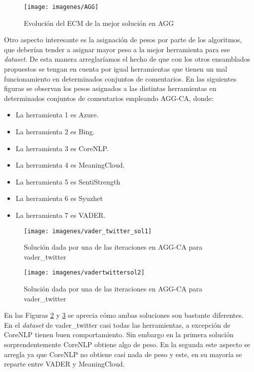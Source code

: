 \begin{figure} [H]
	\centering
	\texttt{[image: imagenes/AGG]}
	\caption{Evolución del ECM de la mejor solución en AGG}
	\label{fig:agg}
\end{figure}

Otro aspecto interesante es la asignación de pesos por parte de los algoritmos, que deberían tender a asignar mayor peso a la mejor herramienta para ese \textit{dataset}. De esta manera arreglaríamos el hecho de que con los otros ensamblados propuestos se tengan en cuenta por igual herramientas que tienen un mal funcionamiento en determinados conjuntos de comentarios. En las siguientes figuras se observan los pesos asignados a las distintas herramientas en determinados conjuntos de comentarios empleando AGG-CA, donde:
\begin{itemize}
	\item La herramienta 1 es Azure.
	\item La herramienta 2 es Bing.
	\item La herramienta 3 es CoreNLP.
	\item La herramienta 4 es MeaningCloud.
	\item La herramienta 5 es SentiStrength
	\item La herramienta 6 es Syuzhet
	\item La herramienta 7 es VADER.
\end{itemize}
\begin{figure} [H]
	\centering
	\texttt{[image: imagenes/vader\_twitter\_sol1]}
	\caption{Solución dada por una de las iteraciones en AGG-CA para vader\_twitter}
	\label{fig:vadertwittersol1}
\end{figure}

\begin{figure} [H]
	\centering
	\texttt{[image: imagenes/vadertwittersol2]}
	\caption{Solución dada por una de las iteraciones en AGG-CA para vader\_twitter}
	\label{fig:vadertwittersol2}
\end{figure}

En las Figuras \ref{fig:vadertwittersol1} y \ref{fig:vadertwittersol2} se aprecia cómo ambas soluciones son bastante diferentes. En el \textit{dataset} de vader\_twitter casi todas las herramientas, a excepción de CoreNLP tienen buen comportamiento. Sin embargo en la primera solución sorprendentemente CoreNLP obtiene algo de peso. En la segunda este aspecto se arregla ya que CoreNLP no obtiene casi nada de peso y este, en su mayoría se reparte entre VADER y MeaningCloud.

